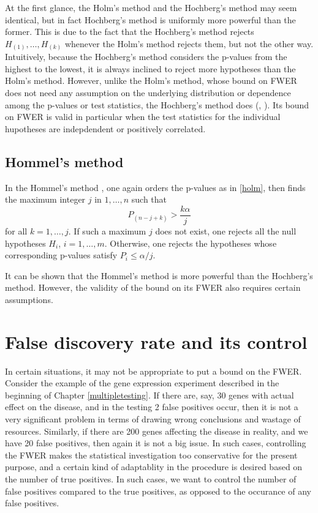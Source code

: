 \documentclass[
]{book}
\begin{document}
At the first glance, the Holm's method and the Hochberg's method may seem identical, but in fact Hochberg's method is uniformly more powerful than the former. This is due to the fact that the Hochberg's method rejects \(H_{(1)}, \ldots, H_{(k)}\) whenever the Holm's method rejects them, but not the other way. Intuitively, because the Hochberg's method considers the p-values from the highest to the lowest, it is always inclined to reject more hypotheses than the Holm's method.
However, unlike the Holm's method, whose bound on FWER does not need any assumption on the underlying distribution or dependence among the p-values or test statistics, the Hochberg's method does (\citet{sarkar1997simes}, \citet{sarkar1998some}). Its bound on FWER is valid in particular when the test statistics for the individual hupotheses are indepdendent or positively correlated.

\hypertarget{hommel}{%
\subsection{Hommel's method}\label{hommel}}

In the Hommel's method \citep{hommel1988stagewise}, one again orders the p-values as in \ref{holm}, then finds the maximum integer \(j\) in \(1, \ldots, n\) such that \[P_{(n - j + k)} > \frac{k \alpha}{j}\] for all \(k = 1, \ldots, j\). If such a maximum \(j\) does not exist, one rejects all the null hypotheses \(H_i\), \(i = 1, \ldots, m\). Otherwise, one rejects the hypotheses whose corresponding p-values satisfy \(P_i \le \alpha / j\).

It can be shown that the Hommel's method is more powerful than the Hochberg's method. However, the validity of the bound on its FWER also requires certain assumptions.

\hypertarget{FDR}{%
\section{False discovery rate and its control}\label{FDR}}

In certain situations, it may not be appropriate to put a bound on the FWER. Consider the example of the gene expression experiment described in the beginning of Chapter \ref{multipletesting}. If there are, say, 30 genes with actual effect on the disease, and in the testing 2 false positives occur, then it is not a very significant problem in terms of drawing wrong conclusions and wastage of resources. Similarly, if there are 200 genes affecting the disease in reality, and we have 20 false positives, then again it is not a big issue. In such cases, controlling the FWER makes the statistical investigation too conservative for the present purpose, and a certain kind of adaptablity in the procedure is desired based on the number of true positives. In such cases, we want to control the number of false positives compared to the true positives, as opposed to the occurance of any false positives.
\end{document}
